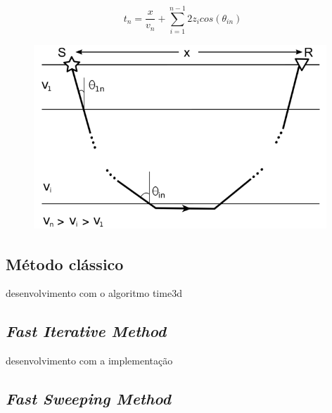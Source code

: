 \begin{equation}
	t_n = \dfrac{x}{v_n} + \displaystyle\sum_{i=1}^{n-1} 2z_i cos(\theta_{in})
\end{equation}

\begin{figure}[H]
	\centering
	\includegraphics[width = 11cm, height = 7cm]{Imgs/RevisaoBibliografica/refracted_analytic.png}
	\caption{}
	\label{fig:refracted_analytic}
\end{figure}



\subsection*{Método clássico}

\cite{vidale1988finite}
\cite{podvin1991finite}
\cite{afnimar2000finite}
\cite{tryggvason2006travel}

desenvolvimento com o algoritmo time3d








\subsection*{\textit{Fast Iterative Method}}

\cite{jeong2008fast}
\cite{sethian1999fast}

\cite{fu2011fast, fu2013fast}

\cite{dang2014fast, hong2016multi, hong2022mg}

\cite{cai2023improved}

desenvolvimento com a implementação 






\subsection*{\textit{Fast Sweeping Method}}

